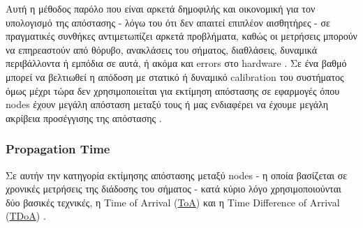 Αυτή η μέθοδος παρόλο που είναι αρκετά δημοφιλής και οικονομική για τον υπολογισμό της απόστασης
- λόγω του ότι δεν απαιτεί επιπλέον αισθητήρες - σε πραγματικές 
συνθήκες αντιμετωπίζει αρκετά προβλήματα, καθώς οι μετρήσεις μπορούν να επηρεαστούν από θόρυβο,
ανακλάσεις του σήματος, διαθλάσεις, δυναμικά περιβάλλοντα ή εμπόδια σε αυτά, ή ακόμα και errors στο hardware 
\cite{wsn-Localization-systems} \cite{ideal-rssi-model}.
Σε ένα βαθμό μπορεί να βελτιωθεί η απόδοση με στατικό ή δυναμικό calibration του συστήματος 
όμως μέχρι τώρα δεν χρησιμοποιείται για εκτίμηση απόστασης σε εφαρμογές όπου nodes έχουν μεγάλη
απόσταση μεταξύ τους ή μας ενδιαφέρει να έχουμε μεγάλη ακρίβεια προσέγγισης της απόστασης \cite{ideal-rssi-model}.

\subsubsection{Propagation Time}
Σε αυτήν την κατηγορία εκτίμησης απόστασης μεταξύ nodes - η οποία βασίζεται σε χρονικές μετρήσεις της διάδοσης του σήματος
- κατά κύριο λόγο χρησιμοποιούνται δύο βασικές τεχνικές, η Time of Arrival (\hyperref[abbr:ToA]{ToA}) και η Time 
Difference of Arrival (\hyperref[abbr:TDoA]{TDoA}) \cite{wsn-Localization-systems}. 

